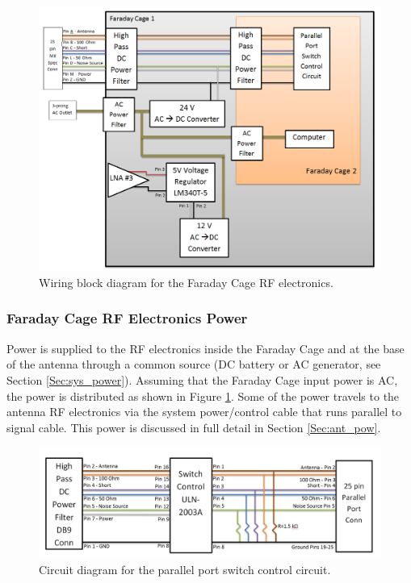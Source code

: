 \begin{figure}[htb]
\begin{center}
\includegraphics[width=0.9\linewidth]{SCIHI_system/figures/fcage_rf_power_block_diagram.png}
\caption{Wiring block diagram for the Faraday Cage RF electronics.}
\label{Fig:fcage_RF_pow_block_diagram}
\end{center}
\end{figure}

\subsubsection{Faraday Cage RF Electronics Power}
Power is supplied to the RF electronics inside the Faraday Cage and at the base of the antenna through a common source (DC battery or AC generator, see Section \ref{Sec:sys_power}). Assuming that the Faraday Cage input power is AC, the power is distributed as shown in Figure \ref{Fig:fcage_RF_pow_block_diagram}. Some of the power travels to the antenna RF electronics via the system power/control cable that runs parallel to signal cable. This power is discussed in full detail in Section \ref{Sec:ant_pow}. 

\begin{figure}[htb]
\begin{center}
\includegraphics[width=0.9\linewidth]{SCIHI_system/figures/fcage_pp_con_circuit_diagram.png}
\caption{Circuit diagram for the parallel port switch control circuit.}
\label{Fig:fcage_ppcon_block_diagram}
\end{center}
\end{figure}

